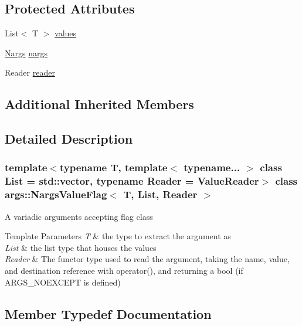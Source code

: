 \subsection*{Protected Attributes}
\begin{DoxyCompactItemize}
\item 
List$<$ T $>$ \hyperlink{classargs_1_1_nargs_value_flag_ab01fe7ab5b0979e15ce0d2d0896807db}{values}
\item 
\hyperlink{structargs_1_1_nargs}{Nargs} \hyperlink{classargs_1_1_nargs_value_flag_aaf60f389b1e4dc014792e4e515129db5}{nargs}
\item 
Reader \hyperlink{classargs_1_1_nargs_value_flag_a8308b02f086b773b21e588c0e36b6656}{reader}
\end{DoxyCompactItemize}
\subsection*{Additional Inherited Members}


\subsection{Detailed Description}
\subsubsection*{template$<$typename T, template$<$ typename... $>$ class List = std\+::vector, typename Reader = Value\+Reader$>$\newline
class args\+::\+Nargs\+Value\+Flag$<$ T, List, Reader $>$}

A variadic arguments accepting flag class


\begin{DoxyTemplParams}{Template Parameters}
{\em T} & the type to extract the argument as \\
\hline
{\em List} & the list type that houses the values \\
\hline
{\em Reader} & The functor type used to read the argument, taking the name, value, and destination reference with operator(), and returning a bool (if A\+R\+G\+S\+\_\+\+N\+O\+E\+X\+C\+E\+PT is defined) \\
\hline
\end{DoxyTemplParams}


\subsection{Member Typedef Documentation}
\mbox{\label{classargs_1_1_nargs_value_flag_a9c828e4bc64b0037e7e50bb98595a47f}} 
